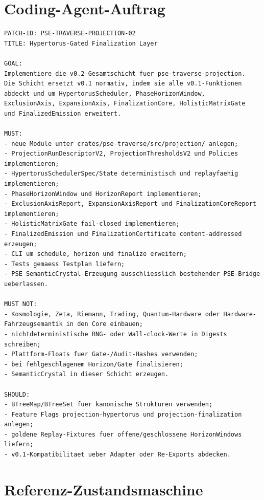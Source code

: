 \documentclass[11pt,a4paper]{article}
\begin{document}
\section{Coding-Agent-Auftrag}

\begin{lstlisting}
PATCH-ID: PSE-TRAVERSE-PROJECTION-02
TITLE: Hypertorus-Gated Finalization Layer

GOAL:
Implementiere die v0.2-Gesamtschicht fuer pse-traverse-projection.
Die Schicht ersetzt v0.1 normativ, indem sie alle v0.1-Funktionen
abdeckt und um HypertorusScheduler, PhaseHorizonWindow,
ExclusionAxis, ExpansionAxis, FinalizationCore, HolisticMatrixGate
und FinalizedEmission erweitert.

MUST:
- neue Module unter crates/pse-traverse/src/projection/ anlegen;
- ProjectionRunDescriptorV2, ProjectionThresholdsV2 und Policies implementieren;
- HypertorusSchedulerSpec/State deterministisch und replayfaehig implementieren;
- PhaseHorizonWindow und HorizonReport implementieren;
- ExclusionAxisReport, ExpansionAxisReport und FinalizationCoreReport implementieren;
- HolisticMatrixGate fail-closed implementieren;
- FinalizedEmission und FinalizationCertificate content-addressed erzeugen;
- CLI um schedule, horizon und finalize erweitern;
- Tests gemaess Testplan liefern;
- PSE SemanticCrystal-Erzeugung ausschliesslich bestehender PSE-Bridge ueberlassen.

MUST NOT:
- Kosmologie, Zeta, Riemann, Trading, Quantum-Hardware oder Hardware-Fahrzeugsemantik in den Core einbauen;
- nichtdeterministische RNG- oder Wall-clock-Werte in Digests schreiben;
- Plattform-Floats fuer Gate-/Audit-Hashes verwenden;
- bei fehlgeschlagenem Horizon/Gate finalisieren;
- SemanticCrystal in dieser Schicht erzeugen.

SHOULD:
- BTreeMap/BTreeSet fuer kanonische Strukturen verwenden;
- Feature Flags projection-hypertorus und projection-finalization anlegen;
- goldene Replay-Fixtures fuer offene/geschlossene HorizonWindows liefern;
- v0.1-Kompatibilitaet ueber Adapter oder Re-Exports abdecken.
\end{lstlisting}

\section{Referenz-Zustandsmaschine}
\end{document}
